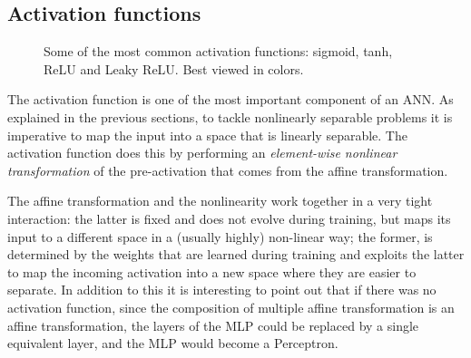 \subsection{Activation functions}\label{sec:activations}
\begin{figure}[t]
    \centering
    \caption{Some of the most common activation functions: sigmoid, tanh, ReLU
        and Leaky ReLU. Best viewed in colors.\label{fig:activations}}
\end{figure}

The activation function is one of the most important component of an ANN. As
explained in the previous sections, to tackle nonlinearly separable problems it
is imperative to map the input into a space that is linearly separable. The
activation function does this by performing an \emph{element-wise nonlinear
transformation} of the pre-activation that comes from the affine
transformation.

The affine transformation and the nonlinearity work together in a very tight
interaction: the latter is fixed and does not evolve during training, but
maps its input to a different space in a (usually highly) non-linear way; the
former, is determined by the weights that are learned during training and
exploits the latter to map the incoming activation into a new space where they
are easier to separate. In addition to this it is interesting to point out that
if there was no activation function, since the composition of multiple affine
transformation is an affine transformation, the layers of the MLP could be
replaced by a single equivalent layer, and the MLP would become a Perceptron.

